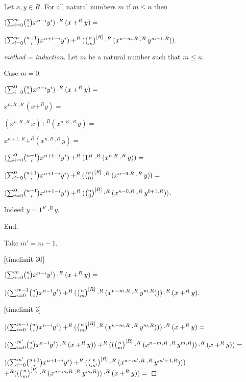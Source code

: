 \documentclass[11pt]{article}
\begin{document}
\begin{forthel}

\begin{lemma}
Let $x,y \in R$. For all natural numbers $m$ if $m \leq n$ then

$(\binsum{m}{n}{x}{y}{R}) \cdot^{R} (x +^{R} y) =$

$(\binsum{m}{n+1}{x}{y}{R}) +^{R} 
(\cho{n}{m}^{[R]} \cdot^{R} (x^{n-m,R} \cdot^{R} y^{m+1,R})).$
\end{lemma}

\begin{proof}[method = induction]
Let $m$ be a natural number such that $m \leq n$.

Case $m = 0$. 

$(\binsum{0}{n}{x}{y}{R}) \cdot^{R} (x +^{R} y) =$

$x^{n,R} \cdot^{R} (x +^{R} y) =$

$(x^{n,R} \cdot^{R} x) +^{R} (x^{n,R} \cdot^{R} y) =$

$x^{n+1,R} +^{R} (x^{n,R} \cdot^{R} y) =$

$(\binsum{0}{n+1}{x}{y}{R}) +^{R} (1^{R} \cdot^{R}(x^{n,R} \cdot^{R} y)) =$

$(\binsum{0}{n+1}{x}{y}{R}) +^{R} (\cho{n}{0}^{[R]} \cdot^{R}(x^{n-0,R} \cdot^{R} y)) =$

$(\binsum{0}{n+1}{x}{y}{R}) +^{R} (\cho{n}{0}^{[R]} \cdot^{R}(x^{n-0,R} \cdot^{R} y^{0+1,R}))$.

Indeed $y = 1^{R} \cdot^{R} y$.

End.

Take $m' = m-1$.

[timelimit 30]

$(\binsum{m}{n}{x}{y}{R}) \cdot^{R} (x +^{R} y) = $

$((\binsum{m-1}{n}{x}{y}{R}) +^{R} 
(\cho{n}{m}^{[R]} \cdot^{R} (x^{n - m,R} \cdot^{R} y^{m,R}))) \cdot^{R} (x +^{R} y)$.

[timelimit 3]

$((\binsum{m-1}{n}{x}{y}{R}) +^{R} 
(\cho{n}{m}^{[R]} \cdot^{R} (x^{n - m,R} \cdot^{R} y^{m,R}))) \cdot^{R} (x +^{R} y) =$

$ ((\binsum{m'}{n}{x}{y}{R}) \cdot^{R} (x +^{R} y)) +^{R} 
((\cho{n}{m}^{[R]} \cdot^{R} (x^{n - m,R} \cdot^{R} y^{m,R})) \cdot^{R} (x +^{R} y)) =$

$ ((\binsum{m'}{n+1}{x}{y}{R}) +^{R} (\cho{n}{m'}^{[R]} \cdot^{R} (x^{n-m',R} \cdot^{R} y^{m'+1,R}))) $
$ +^{R} ((\cho{n}{m}^{[R]} \cdot^{R} (x^{n - m,R} \cdot^{R} y^{m,R})) \cdot^{R} (x +^{R} y)) =$


\end{proof}
\end{forthel}
\end{document}
